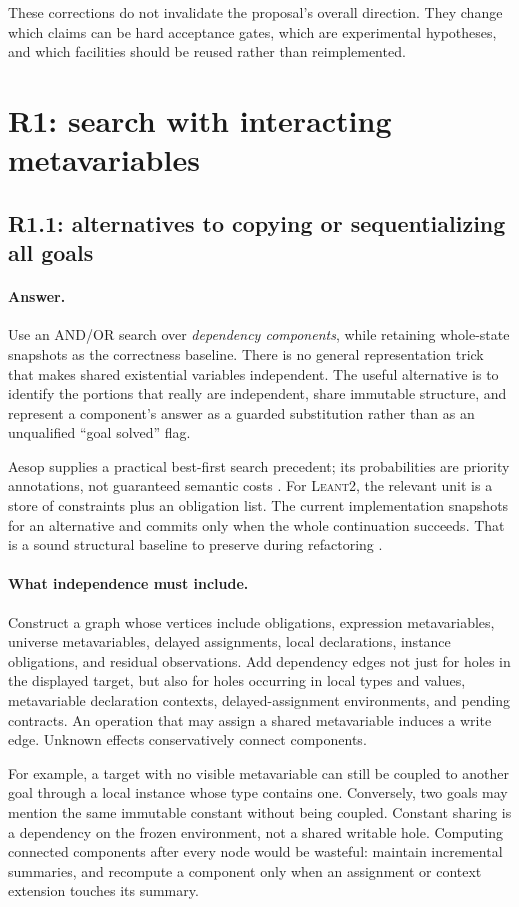\documentclass[11pt,a4paper]{article}
\newcommand{\code}[1]{\texttt{\detokenize{#1}}}
\newcommand{\repo}{\textsc{Leant2}}
\newcommand{\answer}{\paragraph{Answer.}}
\theoremstyle{definition}
\theoremstyle{remark}
\begin{document}
These corrections do not invalidate the proposal's overall direction. They
change which claims can be hard acceptance gates, which are experimental
hypotheses, and which facilities should be reused rather than reimplemented.

\section{R1: search with interacting metavariables}
\label{sec:r1}

\subsection{R1.1: alternatives to copying or sequentializing all goals}
\answer Use an AND/OR search over \emph{dependency components}, while retaining
whole-state snapshots as the correctness baseline. There is no general
representation trick that makes shared existential variables independent. The
useful alternative is to identify the portions that really are independent,
share immutable structure, and represent a component's answer as a guarded
substitution rather than as an unqualified ``goal solved'' flag.

Aesop supplies a practical best-first search precedent; its probabilities are
priority annotations, not guaranteed semantic costs \cite{aesop,aesopreadme}.
For \repo{}, the relevant unit is a store of constraints plus an obligation
list. The current implementation snapshots \code{Meta.SavedState} for an
alternative and commits only when the whole continuation succeeds. That is a
sound structural baseline to preserve during refactoring \cite{repo}.

\paragraph{What independence must include.}
Construct a graph whose vertices include obligations, expression metavariables,
universe metavariables, delayed assignments, local declarations, instance
obligations, and residual observations. Add dependency edges not just for holes
in the displayed target, but also for holes occurring in local types and values,
metavariable declaration contexts, delayed-assignment environments, and pending
contracts. An operation that may assign a shared metavariable induces a write
edge. Unknown effects conservatively connect components.

For example, a target with no visible metavariable can still be coupled to
another goal through a local instance whose type contains one. Conversely, two
goals may mention the same immutable constant without being coupled. Constant
sharing is a dependency on the frozen environment, not a shared writable hole.
Computing connected components after every node would be wasteful: maintain
incremental summaries, and recompute a component only when an assignment or
context extension touches its summary.
\end{document}
